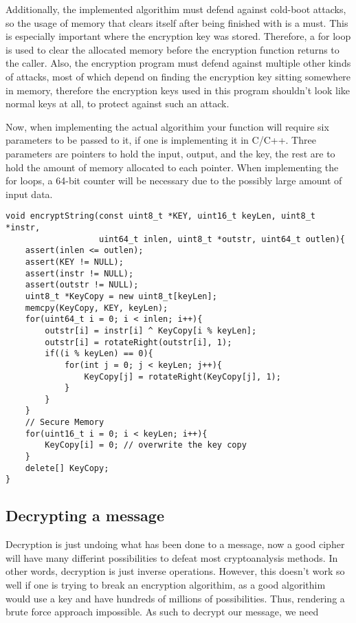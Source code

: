 \documentclass[12pt]{article}
\begin{document}
    Additionally, the implemented algorithim must defend against cold-boot
    attacks, so the usage of memory that clears itself after being finished
    with is a must. This is especially important where the encryption key
    was stored. Therefore, a for loop is used to clear the allocated memory
    before the encryption function returns to the caller. Also, the
    encryption program must defend against multiple other kinds of attacks,
    most of which depend on finding the encryption key sitting somewhere
    in memory, therefore the encryption keys used in this program shouldn't
    look like normal keys at all, to protect against such an attack.
    
    Now, when implementing the actual algorithim your function will require
    six parameters to be passed to it, if one is implementing it in C/C++.
    Three parameters are pointers to hold the input, output, and the key, the
    rest are to hold the amount of memory allocated to each pointer. When
    implementing the for loops, a 64-bit counter will be necessary due to the
    possibly large amount of input data.

    \singlespacing
    \lstset{language=C++,
            basicstyle=\small,
            numbers=left,
            numberstyle=\tiny,
            stepnumber=1}
    \begin{lstlisting}[caption=C++ Encryption Source Code]
void encryptString(const uint8_t *KEY, uint16_t keyLen, uint8_t *instr,
                   uint64_t inlen, uint8_t *outstr, uint64_t outlen){
    assert(inlen <= outlen);
    assert(KEY != NULL);
    assert(instr != NULL);
    assert(outstr != NULL);
    uint8_t *KeyCopy = new uint8_t[keyLen];
    memcpy(KeyCopy, KEY, keyLen);
    for(uint64_t i = 0; i < inlen; i++){
        outstr[i] = instr[i] ^ KeyCopy[i % keyLen];
        outstr[i] = rotateRight(outstr[i], 1);
        if((i % keyLen) == 0){
            for(int j = 0; j < keyLen; j++){
                KeyCopy[j] = rotateRight(KeyCopy[j], 1);
            }
        }
    }
    // Secure Memory
    for(uint16_t i = 0; i < keyLen; i++){
        KeyCopy[i] = 0; // overwrite the key copy
    }
    delete[] KeyCopy;
}
    \end{lstlisting}

    

\doublespacing
\subsection{Decrypting a message}
    Decryption is just undoing what has been done to a message, now a
    good cipher will have many differint possibilities to defeat most
    cryptoanalysis methods. In other words, decryption is just inverse
    operations. However, this doesn't work so well if one is trying to
    break an encryption algorithim, as  a good algorithim would use a
    key and have hundreds of millions of possibilities. Thus, rendering
    a brute force approach impossible. As such to decrypt our message,
    we need 
\end{document}
